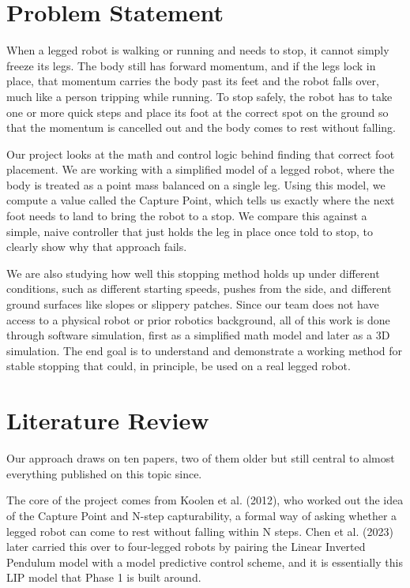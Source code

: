 \documentclass{llncs}
\begin{document}
\section{Problem Statement}
\label{sec:problem}

When a legged robot is walking or running and needs to stop, it cannot simply freeze its legs.
The body still has forward momentum, and if the legs lock in place, that momentum carries the
body past its feet and the robot falls over, much like a person tripping while running. To stop
safely, the robot has to take one or more quick steps and place its foot at the correct spot on
the ground so that the momentum is cancelled out and the body comes to rest without falling.

Our project looks at the math and control logic behind finding that correct foot placement. We
are working with a simplified model of a legged robot, where the body is treated as a point mass
balanced on a single leg. Using this model, we compute a value called the Capture Point, which
tells us exactly where the next foot needs to land to bring the robot to a stop. We compare this
against a simple, naive controller that just holds the leg in place once told to stop, to clearly
show why that approach fails.

We are also studying how well this stopping method holds up under different conditions, such as
different starting speeds, pushes from the side, and different ground surfaces like slopes or
slippery patches. Since our team does not have access to a physical robot or prior robotics
background, all of this work is done through software simulation, first as a simplified math
model and later as a 3D simulation. The end goal is to understand and demonstrate a working
method for stable stopping that could, in principle, be used on a real legged robot.

\section{Literature Review}
\label{sec:litreview}

Our approach draws on ten papers, two of them older but still central to almost everything
published on this topic since.

The core of the project comes from Koolen et al. (2012), who worked out the idea of the Capture
Point and N-step capturability, a formal way of asking whether a legged robot can come to rest
without falling within N steps. Chen et al. (2023) later carried this over to four-legged robots
by pairing the Linear Inverted Pendulum model with a model predictive control scheme, and it is
essentially this LIP model that Phase 1 is built around.
\end{document}
